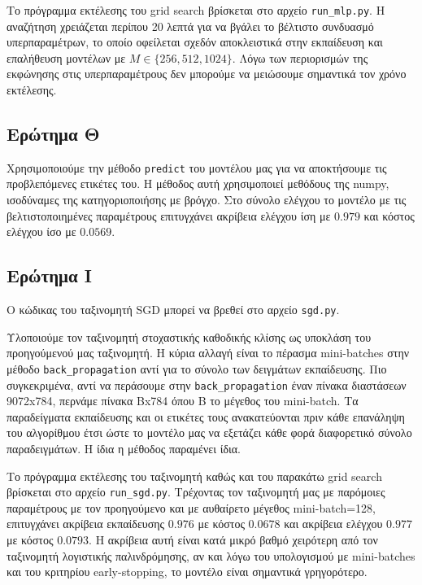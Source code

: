 \documentclass{article}
\newcommand{\code}{\texttt}
\begin{document}
Το πρόγραμμα εκτέλεσης του grid search βρίσκεται στο αρχείο \code{run\_mlp.py}. Η αναζήτηση χρειάζεται περίπου 20 λεπτά για να βγάλει το βέλτιστο συνδυασμό υπερπαραμέτρων, το οποίο οφείλεται σχεδόν αποκλειστικά στην εκπαίδευση και επαλήθευση μοντέλων με $M \in \{256, 512, 1024\}$. Λόγω των περιορισμών της εκφώνησης στις υπερπαραμέτρους δεν μπορούμε να μειώσουμε σημαντικά τον χρόνο εκτέλεσης.


\subsection{Ερώτημα Θ}

Χρησιμοποιούμε την μέθοδο \code{predict} του μοντέλου μας για να αποκτήσουμε τις προβλεπόμενες ετικέτες του. Η μέθοδος αυτή χρησιμοποιεί μεθόδους της numpy, ισοδύναμες της κατηγοριοποιήσης με βρόγχο. Στο σύνολο ελέγχου το μοντέλο με τις βελτιστοποιημένες παραμέτρους επιτυγχάνει ακρίβεια ελέγχου ίση με $0.979$ και κόστος ελέγχου ίσο με $0.0569$.

\subsection{Ερώτημα Ι}

Ο κώδικας του ταξινομητή SGD μπορεί να βρεθεί στο αρχείο \code{sgd.py}.

Υλοποιούμε τον ταξινομητή στοχαστικής καθοδικής κλίσης ως υποκλάση του προηγούμενού μας ταξινομητή. Η κύρια αλλαγή είναι το πέρασμα mini-batches στην μέθοδο \code{back\_propagation} αντί για το σύνολο των δειγμάτων εκπαίδευσης. Πιο συγκεκριμένα, αντί να περάσουμε στην \code{back\_propagation} έναν πίνακα διαστάσεων 9072x784, περνάμε πίνακα Βx784 όπου Β το μέγεθος του mini-batch. Τα παραδείγματα εκπαίδευσης και οι ετικέτες τους ανακατεύονται πριν κάθε επανάληψη του αλγορίθμου έτσι ώστε το μοντέλο μας να εξετάζει κάθε φορά διαφορετικό σύνολο παραδειγμάτων. Η ίδια η μέθοδος παραμένει ίδια.

 Το πρόγραμμα εκτέλεσης του ταξινομητή καθώς και του παρακάτω grid search βρίσκεται στο αρχείο \code{run\_sgd.py}. Τρέχοντας τον ταξινομητή μας με παρόμοιες παραμέτρους με τον προηγούμενο και με αυθαίρετο μέγεθος mini-batch=128, επιτυγχάνει ακρίβεια εκπαίδευσης $0.976$ με κόστος $0.0678$ και ακρίβεια ελέγχου $0.977$ με κόστος $0.0793$. Η ακρίβεια αυτή είναι κατά μικρό βαθμό χειρότερη από τον ταξινομητή λογιστικής παλινδρόμησης, αν και λόγω του υπολογισμού με mini-batches και του κριτηρίου early-stopping, το μοντέλο είναι σημαντικά γρηγορότερο.
 
\end{document}

